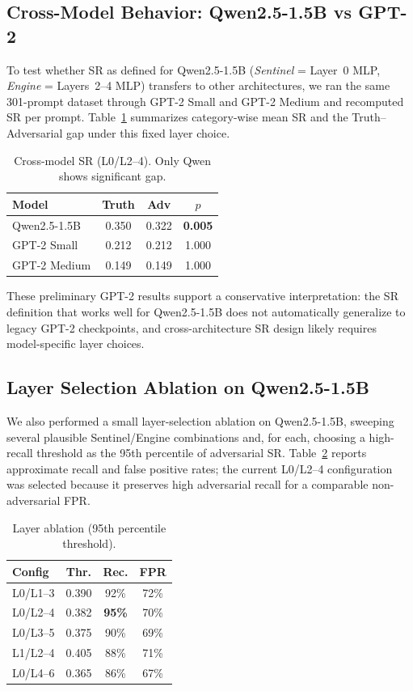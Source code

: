 \subsection{Cross-Model Behavior: Qwen2.5-1.5B vs GPT-2}

To test whether SR as defined for Qwen2.5-1.5B (\emph{Sentinel} = Layer~0 MLP, \emph{Engine} = Layers~2--4 MLP) transfers to other
architectures, we ran the same 301-prompt dataset through GPT-2 Small and GPT-2 Medium and recomputed SR per prompt. Table~\ref{tab:cross_model_sr}
summarizes category-wise mean SR and the Truth--Adversarial gap under this fixed layer choice.

\begin{table}[h]
\centering
\caption{Cross-model SR (L0/L2--4). Only Qwen shows significant gap.}
\label{tab:cross_model_sr}
\begin{tabular}{|l|c|c|c|}
\hline
\textbf{Model} & \textbf{Truth} & \textbf{Adv} & \textbf{$p$} \\
\hline
Qwen2.5-1.5B & 0.350 & 0.322 & \textbf{0.005} \\
GPT-2 Small & 0.212 & 0.212 & 1.000 \\
GPT-2 Medium & 0.149 & 0.149 & 1.000 \\
\hline
\end{tabular}
\end{table}

These preliminary GPT-2 results support a conservative interpretation: the SR definition that works well for Qwen2.5-1.5B does
not automatically generalize to legacy GPT-2 checkpoints, and cross-architecture SR design likely requires model-specific layer
choices.

\subsection{Layer Selection Ablation on Qwen2.5-1.5B}

We also performed a small layer-selection ablation on Qwen2.5-1.5B, sweeping several plausible Sentinel/Engine combinations and,
for each, choosing a high-recall threshold as the 95th percentile of adversarial SR. Table~\ref{tab:layer_ablation} reports
approximate recall and false positive rates; the current L0/L2--4 configuration was selected because it preserves high
adversarial recall for a comparable non-adversarial FPR.

\begin{table}[h]
\centering
\caption{Layer ablation (95th percentile threshold).}
\label{tab:layer_ablation}
\begin{tabular*}{\columnwidth}{@{\extracolsep{\fill}}lccc@{}}
\hline
\textbf{Config} & \textbf{Thr.} & \textbf{Rec.} & \textbf{FPR} \\
\hline
L0/L1--3 & 0.390 & 92\% & 72\% \\
L0/L2--4 & 0.382 & \textbf{95\%} & 70\% \\
L0/L3--5 & 0.375 & 90\% & 69\% \\
L1/L2--4 & 0.405 & 88\% & 71\% \\
L0/L4--6 & 0.365 & 86\% & 67\% \\
\hline
\end{tabular*}
\end{table}

